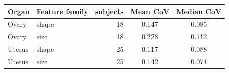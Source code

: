 \begin{tabular}{llrcc}
\toprule
Organ & Feature family & subjects & Mean CoV & Median CoV \\
\midrule
Ovary & shape & 18 & 0.147 & 0.085 \\
Ovary & size & 18 & 0.228 & 0.112 \\
Uterus & shape & 25 & 0.117 & 0.088 \\
Uterus & size & 25 & 0.142 & 0.074 \\
\bottomrule
\end{tabular}
